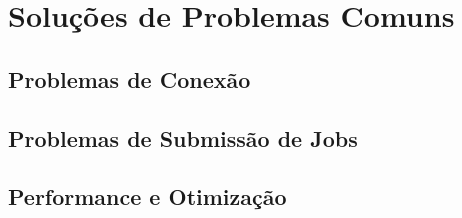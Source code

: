 \chapter{Soluções de Problemas Comuns}
\label{chap:solucoes-de-problemas-comuns}

\section{Problemas de Conexão}
\label{sec:problemas-de-conexao}

\lipsum[1-2]

\section{Problemas de Submissão de Jobs}
\label{sec:problemas-de-submissao-de-jobs}

\lipsum[1-2]

\section{Performance e Otimização}
\label{sec:performance-e-otimizacao}

\lipsum[1-2]
